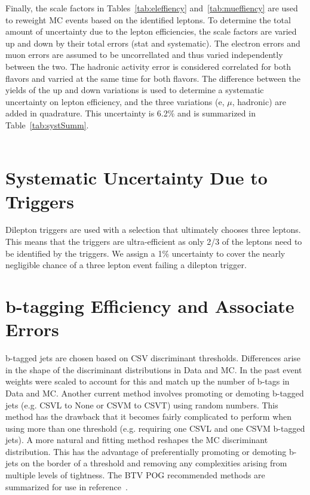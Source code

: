 Finally, the scale factors in Tables~\ref{tab:eleffiency} and~\ref{tab:mueffiency} are used to reweight MC events based on the identified leptons. To determine the total amount of uncertainty due to the lepton efficiencies, the scale factors are varied up and down by their total errors (stat and systematic). The electron errors and muon errors are assumed to be uncorrellated and thus varied independently between the two. The hadronic activity error is considered correlated for both flavors and varried at the same time for both flavors. The difference between the yields of the up and down variations is used to determine a systematic uncertainty on lepton efficiency, and the three variations (e, $\mu$, hadronic) are added in quadrature. This uncertainty is 6.2\% and is summarized in Table~\ref{tab:systSumm}.\\\\





\section{Systematic Uncertainty Due to Triggers}   
\label{sec:trigger_syst}
Dilepton triggers are used with a selection that ultimately chooses three leptons. This means that the triggers are ultra-efficient as only 2/3 of the leptons need to be identified by the triggers. We assign a 1\% uncertainty to cover the nearly negligible chance of a three lepton event failing a dilepton trigger.

\section{b-tagging Efficiency and Associate Errors}
\label{sec:btag_syst}
b-tagged jets are chosen based on CSV discriminant thresholds. Differences arise in the shape of the discriminant distributions in Data and MC. In the past event weights were scaled to account for this and match up the number of b-tags in Data and MC. Another current method involves promoting or demoting b-tagged jets (e.g. CSVL to None or CSVM to CSVT) using random numbers. This method has the drawback that it becomes fairly complicated to perform when using more than one threshold (e.g. requiring one CSVL and one CSVM b-tagged jets). A more natural and fitting method reshapes the MC discriminant distribution. This has the advantage of preferentially promoting or demoting b-jets on the border of a threshold and removing any complexities arising from multiple levels of tightness. The BTV POG recommended methods are summarized for use in reference~\cite{bTagSF}.\\

